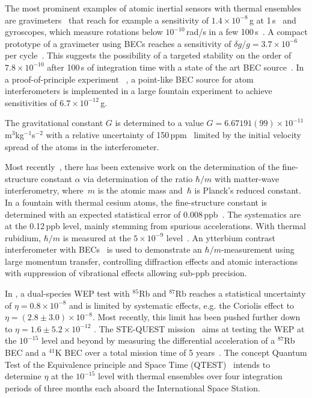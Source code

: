 The most prominent examples of atomic inertial sensors with thermal ensembles are gravimeters~\cite{Freier2016,Mnoret2018} that reach for example a sensitivity of $1.4\times 10^{-8}$\,g at 1\,s~\cite{LeGout2008} and gyroscopes, which measure rotations below $10^{-10}$\,rad/s in a few 100\,s~\cite{Dutta2016}.
A compact prototype  of a gravimeter using BECs reaches a sensitivity of $\delta g/g=3.7\times10^ {-6}$ per cycle~\cite{Abend2016}. This suggests the possibility of a targeted stability on the order of $7.8\times10^{-10}$ after 100\,s of integration time with a state of the art BEC source~\cite{Rudolph2015}.
In a proof-of-principle experiment ~\cite{Dickerson2013}, a point-like BEC source for atom interferometers is implemented in a large fountain experiment to achieve sensitivities of $6.7\times10^{-12}$\,g.

The gravitational constant $G$ is determined to a value $G=6.67191(99)\times 10^{-11}$\,m$^3$kg$^{-1}$s$^{-2}$ with a relative uncertainty of 150\,ppm~\cite{Rosi2014} limited by the initial velocity spread of the atoms in the interferometer.

Most recently~\cite{Parker2018,Yu2019,Clad2019}, there has been extensive work on the determination of the fine-structure constant $\alpha$ via determination of the ratio $\hbar/m$ with matter-wave interferometry, where~$m$ is the atomic mass and~$\hbar$ is Planck's reduced constant.
In a fountain with thermal cesium atoms, the fine-structure constant is determined with an expected statistical error of 0.008\,ppb~\cite{Yu2019}.
The systematics are at the 0.12\,ppb level, mainly stemming from spurious accelerations.
With thermal rubidium, $\hbar/m$ is measured at the $5\times 10^{-9}$ level~\cite{Clad2019}.
An ytterbium contrast interferometer with BECs~\cite{Jamison2014} is used to demonstrate an $\hbar/m$-measurement using large momentum transfer, controlling diffraction effects and atomic interactions with suppression of vibrational effects allowing sub-ppb precision.

In \cite{Zhou2015}, a dual-species WEP test with $^{85}$Rb and $^{87}$Rb reaches a statistical uncertainty of $\eta=0.8\times 10^{-8}$ and is limited by systematic effects, e.g. the Coriolis effect to $\eta=(2.8\pm 3.0)\times 10^{-8}$. Most recently, this limit has been pushed further down to $\eta=1.6\pm5.2\times 10^{-12}$ \cite{Asenbaum2020arxiv}.
The STE-QUEST mission~\cite{Aguilera2014} aims at testing the WEP at the $10^{-15}$ level and beyond by measuring the differential acceleration of a $^{87}$Rb BEC and a $^{41}$K BEC over a total mission time of 5 years~\cite{Battelier2019}.
The concept Quantum Test of the Equivalence principle and Space Time (QTEST)~\cite{Williams2016} intends to determine $\eta$ at the $10^{-15}$ level with thermal ensembles over four integration periods of three months each aboard the International Space Station. 
%
